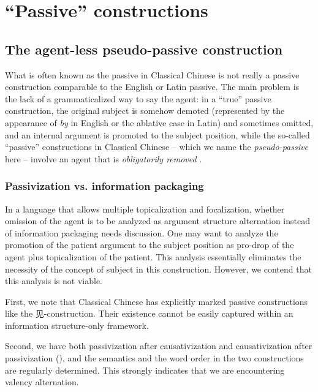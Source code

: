 \documentclass[UTF8, a4paper, oneside, scheme=plain, 12pt]{ctexrep}
\newcommand*{\citepage}[1]{p.~{#1}}
\newcommand*{\term}[1]{\emph{#1}}
\newcommand{\form}[1]{\emph{#1}}
\begin{document}
\section{``Passive'' constructions}\label{sec:grammatical.clause.verbal.argument-structure.passive}

\subsection{The agent-less pseudo-passive construction}\label{sec:grammatical.clause.verbal.argument-structure.pseudo-passive}

What is often known as the passive in Classical Chinese is not really a passive construction
comparable to the English or Latin passive.
The main problem is the lack of a grammaticalized way to say the agent:
in a ``true'' passive construction, the original subject is somehow demoted
(represented by the appearance of \form{by} in English or the ablative case in Latin)
and sometimes omitted, and an internal argument is promoted to the subject position,
while the so-called ``passive'' constructions in Classical Chinese
-- which we name the \term{pseudo-passive} here --
involve an agent that is \emph{obligatorily removed} \citep[\citepage{287-289}]{meiguang2018}.

\subsubsection{Passivization vs. information packaging}\label{sec:grammatical.clause.verbal.argument-structure.pseudo-passive.information-packaging}

In a language that allows multiple topicalization and focalization,
whether omission of the agent is to be analyzed as argument structure alternation
instead of information packaging needs discussion.
One may want to analyze the promotion of the patient argument to the subject position 
as pro-drop of the agent plus topicalization of the patient.
This analysis essentially eliminates the necessity of the concept of subject in this construction.
However, we contend that this analysis is not viable.

First, we note that Classical Chinese has explicitly marked passive constructions like the 见-construction.
Their existence cannot be easily captured within an information structure-only framework.

Second, we have both passivization after causativization and causativization after passivization (),
and the semantics and the word order in the two constructions are regularly determined.
This strongly indicates that we are encountering valency alternation.
\end{document}
